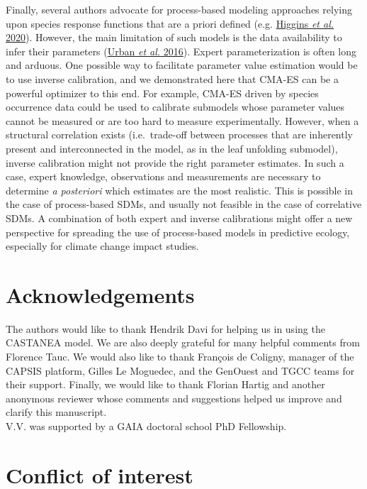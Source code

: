 \documentclass[11pt,]{article}
\begin{document}
Finally, several authors advocate for process-based modeling approaches
relying upon species response functions that are a priori defined (e.g.
\protect\hyperlink{ref-Higgins2020}{Higgins \emph{et al.} 2020}).
However, the main limitation of such models is the data availability to
infer their parameters (\protect\hyperlink{ref-Urban2016}{Urban \emph{et
al.} 2016}). Expert parameterization is often long and arduous. One
possible way to facilitate parameter value estimation would be to use
inverse calibration, and we demonstrated here that CMA-ES can be a
powerful optimizer to this end. For example, CMA-ES driven by species
occurrence data could be used to calibrate submodels whose parameter
values cannot be measured or are too hard to measure experimentally.
However, when a structural correlation exists (i.e.~trade-off between
processes that are inherently present and interconnected in the model,
as in the leaf unfolding submodel), inverse calibration might not
provide the right parameter estimates. In such a case, expert knowledge,
observations and measurements are necessary to determine \emph{a
posteriori} which estimates are the most realistic. This is possible in
the case of process-based SDMs, and usually not feasible in the case of
correlative SDMs. A combination of both expert and inverse calibrations
might offer a new perspective for spreading the use of process-based
models in predictive ecology, especially for climate change impact
studies.

\hypertarget{acknowledgements}{%
\section{Acknowledgements}\label{acknowledgements}}

The authors would like to thank Hendrik Davi for helping us in using the
CASTANEA model. We are also deeply grateful for many helpful comments
from Florence Tauc. We would also like to thank François de Coligny,
manager of the CAPSIS platform, Gilles Le Moguedec, and the GenOuest and
TGCC teams for their support. Finally, we would like to thank Florian
Hartig and another anonymous reviewer whose comments and suggestions
helped us improve and clarify this manuscript.\\
V.V. was supported by a GAIA doctoral school PhD Fellowship.

\hypertarget{conflict-of-interest}{%
\section{Conflict of interest}\label{conflict-of-interest}}
\end{document}

